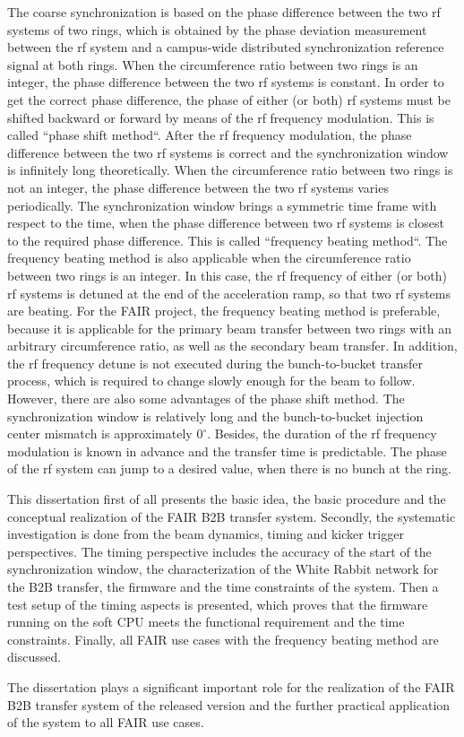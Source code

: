 The coarse synchronization is based on the phase difference between the two rf systems of two rings, which is obtained by the phase deviation measurement between the rf system and a campus-wide distributed synchronization reference signal at both rings. When the circumference ratio between two rings is an integer, the phase difference between the two rf systems is constant. In order to get the correct phase difference, the phase of either (or both) rf systems must be shifted backward or forward by means of the rf frequency modulation. This is called ``phase shift method``. After the rf frequency modulation, the phase difference between the two rf systems is correct and the synchronization window is infinitely long theoretically. When the circumference ratio between two rings is not an integer, the phase difference between the two rf systems varies periodically. The synchronization window brings a symmetric
time frame with respect to the time, when the phase difference between two rf systems is closest to the required phase difference. This is called ``frequency beating method``. The frequency beating method is also applicable when the circumference ratio between two rings is an integer. In this case, the rf frequency of either (or both) rf systems is detuned at the end of the acceleration ramp, so that two rf systems are beating. For the FAIR project, the frequency beating method is preferable, because it is applicable for the primary beam transfer between two rings with an arbitrary circumference ratio, as well as the secondary beam transfer. In addition, the rf frequency detune is not executed during the bunch-to-bucket transfer process, which is required to change slowly enough for the beam to follow. However, there are also some advantages of the phase shift method. The synchronization window is relatively long and the bunch-to-bucket injection center mismatch is approximately $0^\circ$. Besides, the duration of the rf frequency modulation is known in advance and the transfer time is predictable. The phase of the rf system can jump to a desired value, when there is no bunch at the ring.  


 
This dissertation first of all presents the basic idea, the basic procedure and the conceptual realization of the FAIR B2B transfer system. Secondly, the systematic investigation is done from the beam dynamics, timing and kicker trigger perspectives. The timing perspective includes the accuracy of the start of the synchronization window, the characterization of the White Rabbit network for the B2B transfer, the firmware and the time constraints of the system. Then a test setup of the timing aspects is presented, which proves that the firmware running on the soft CPU meets the functional requirement and the time constraints. Finally, all FAIR use cases with the frequency beating method are discussed.

The dissertation plays a significant important role for the realization of the FAIR B2B transfer system of the released version and the further practical application of the system to all FAIR use cases.  



